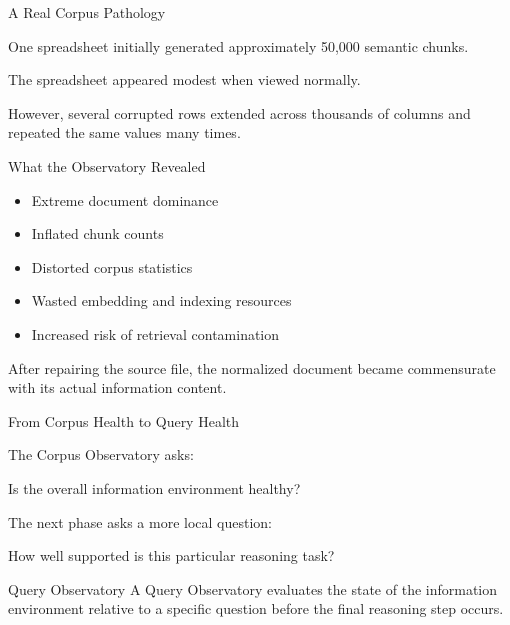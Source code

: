 \documentclass[aspectratio=169]{beamer}
\begin{document}
\begin{frame}{A Real Corpus Pathology}

One spreadsheet initially generated approximately
{\Huge 50,000}
semantic chunks.

\vspace{0.15cm}

The spreadsheet appeared modest when viewed normally.

However, several corrupted rows extended across thousands of columns
and repeated the same values many times.

\vspace{0.25cm}

\begin{block}{What the Observatory Revealed}

\begin{itemize}
\item Extreme document dominance
\item Inflated chunk counts
\item Distorted corpus statistics
\item Wasted embedding and indexing resources
\item Increased risk of retrieval contamination
\end{itemize}

\end{block}

\vspace{0.3cm}

After repairing the source file, the normalized document became
commensurate with its actual information content.

\end{frame}


\begin{frame}{From Corpus Health to Query Health}

The Corpus Observatory asks:

\vspace{0.25cm}

\begin{center}
\Large
Is the overall information environment healthy?
\end{center}

\vspace{0.55cm}

The next phase asks a more local question:

\vspace{0.25cm}

\begin{center}
\Large
How well supported is this particular reasoning task?
\end{center}

\vspace{0.55cm}

\begin{block}{Query Observatory}
A Query Observatory evaluates the state of the information
environment relative to a specific question before the final
reasoning step occurs.
\end{block}

\end{frame}
\end{document}
